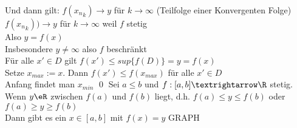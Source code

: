 Und dann gilt: $f({x_n}_k) \to y$ für $k \to \infty$ (Teilfolge einer Konvergenten Folge)\\
\phantom{Und dann gilt: }$f({x_n}_k)) \to y$ für $k \to \infty$ weil $f$ stetig\\
Also $y = f(x)$\\
Insbesondere $y \neq \infty$ also $f$ beschränkt\\
Für alle $x' \in D$ gilt $f(x') \leq sup \{f(D)\} = y = f(x)$\\
Setze $x_{max} := x$. Dann $f(x') \leq f(x_{max})$ für alle $x' \in D$\\
Anfang findet man $x_{min}$ \qed
{}
Sei $a\leq b$ und $f:[a,b]→\R$ stetig.\\
Wenn $y\eR$ zwischen $f(a)$ und $f(b)$  liegt, d.h. $f(a)\leq y \leq f(b)$ oder $f(a)\geq y \geq f(b)$\\
Dann gibt es ein $x\in[a,b]$ mit $f(x)=y$ GRAPH\\
